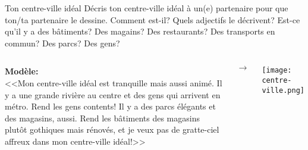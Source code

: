 \begin{frame}{Ton centre-ville idéal}
  \small
  Décris ton centre-ville idéal à un(e) partenaire pour que ton/ta partenaire le dessine.
  Comment est-il?
  Quels adjectifs le décrivent?
  Est-ce qu'il y a des bâtiments?
  Des magains?
  Des restaurants?
  Des transports en commun?
  Des parcs?
  Des gens?
  \vspace{0.15cm}
  \begin{columns}
    \footnotesize
      \textbf{Modèle:} \\
      <<Mon centre-ville idéal est tranquille mais aussi animé. Il y a une grande rivière au centre et des gens qui arrivent en métro. \alert{Rend} les gens contents! Il y a des parcs élégants et des magasins, aussi. \alert{Rend} les bâtiments des magasins plutôt gothiques mais rénovés, et je veux pas de gratte-ciel affreux dans mon centre-ville idéal!>>
      \begin{center}
        $\to$
      \end{center}
      \begin{center}
        \texttt{[image: centre-ville.png]} \\
        \vspace{0.75cm}
      \end{center}
  \end{columns}
\end{frame}